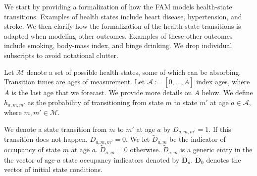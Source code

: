 We start by providing a formalization of how the FAM models health-state transitions. Examples of health states include heart disease, hypertension, and stroke. We then clarify how the formalization of the health-state transitions is adapted when modeling other outcomes. Examples of these other outcomes include smoking, body-mass index, and binge drinking. We drop individual subscripts to avoid notational clutter.

Let $\mathcal{M}$ denote a set of possible health states, some of which can be absorbing. Transition times are ages of measurement. Let $\mathcal{A}:= [ 0, \ldots, \bar{A}]$ index ages, where $\bar{A}$ is the last age that we forecast. We provide more details on $\bar{A}$ below. We define $h_{a,m,m'}$ as the probability of transitioning from state $m$ to state $m'$ at age $a \in \mathcal{A}$, where $m, m' \in \mathcal{M}$.

We denote a state transition from $m$ to $m'$ at age $a$ by $D_{a,m,m'} = 1$. If this transition does not happen,  $D_{a,m,m'} = 0$. We let $\tilde{D}_{a,m}$ be the indicator of occupancy of state $m$ at age $a$. $\tilde{D}_{a,m} = 0$ otherwise. $\tilde{D}_{a,m}$ is a generic entry in the the vector of age-$a$ state occupancy indicators denoted by $\tilde{\bm{D}}_a$. $\tilde{\bm{D}}_0$ denotes the vector of initial state conditions.

